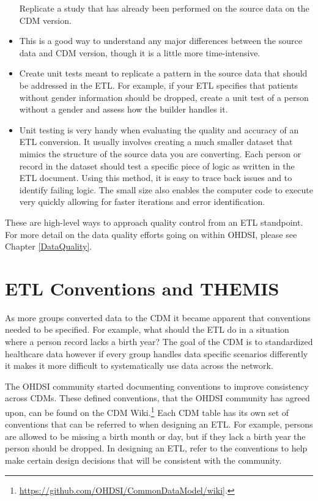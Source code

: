 \documentclass[11pt]{book}
\let\rmarkdownfootnote\footnote%
\def\footnote{\protect\rmarkdownfootnote}
\theoremstyle{definition}
\theoremstyle{definition}
\theoremstyle{definition}
\theoremstyle{remark}
\begin{document}
\begin{itemize}
  Replicate a study that has already been performed on the source data
  on the CDM version.
\item
  This is a good way to understand any major differences between the
  source data and CDM version, though it is a little more
  time-intensive.
\item
  Create unit tests meant to replicate a pattern in the source data that
  should be addressed in the ETL. For example, if your ETL specifies
  that patients without gender information should be dropped, create a
  unit test of a person without a gender and assess how the builder
  handles it.
\item
  Unit testing is very handy when evaluating the quality and accuracy of
  an ETL conversion. It usually involves creating a much smaller dataset
  that mimics the structure of the source data you are converting. Each
  person or record in the dataset should test a specific piece of logic
  as written in the ETL document. Using this method, it is easy to trace
  back issues and to identify failing logic. The small size also enables
  the computer code to execute very quickly allowing for faster
  iterations and error identification.
\end{itemize}

These are high-level ways to approach quality control from an ETL
standpoint. For more detail on the data quality efforts going on within
OHDSI, please see Chapter \ref{DataQuality}.

\section{ETL Conventions and THEMIS}\label{etl-conventions-and-themis}

As more groups converted data to the CDM it became apparent that
conventions needed to be specified. For example, what should the ETL do
in a situation where a person record lacks a birth year? The goal of the
CDM is to standardized healthcare data however if every group handles
data specific scenarios differently it makes it more difficult to
systematically use data across the network.

The OHDSI community started documenting conventions to improve
consistency across CDMs. These defined conventions, that the OHDSI
community has agreed upon, can be found on the CDM Wiki.\footnote{\url{https://github.com/OHDSI/CommonDataModel/wiki}{]}.}
Each CDM table has its own set of conventions that can be referred to
when designing an ETL. For example, persons are allowed to be missing a
birth month or day, but if they lack a birth year the person should be
dropped. In designing an ETL, refer to the conventions to help make
certain design decisions that will be consistent with the community.
\end{document}
